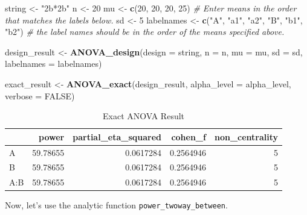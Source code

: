 \documentclass[
]{book}
\newenvironment{Shaded}{\begin{snugshade}}{\end{snugshade}}
\newcommand{\CommentTok}[1]{\textcolor[rgb]{0.56,0.35,0.01}{\textit{#1}}}
\newcommand{\DataTypeTok}[1]{\textcolor[rgb]{0.13,0.29,0.53}{#1}}
\newcommand{\DecValTok}[1]{\textcolor[rgb]{0.00,0.00,0.81}{#1}}
\newcommand{\KeywordTok}[1]{\textcolor[rgb]{0.13,0.29,0.53}{\textbf{#1}}}
\newcommand{\NormalTok}[1]{#1}
\newcommand{\OperatorTok}[1]{\textcolor[rgb]{0.81,0.36,0.00}{\textbf{#1}}}
\newcommand{\OtherTok}[1]{\textcolor[rgb]{0.56,0.35,0.01}{#1}}
\newcommand{\StringTok}[1]{\textcolor[rgb]{0.31,0.60,0.02}{#1}}
\begin{document}
\begin{Shaded}
\begin{Highlighting}[]
\NormalTok{string <-}\StringTok{ "2b*2b"}
\NormalTok{n <-}\StringTok{ }\DecValTok{20}
\NormalTok{mu <-}\StringTok{ }\KeywordTok{c}\NormalTok{(}\DecValTok{20}\NormalTok{, }\DecValTok{20}\NormalTok{, }\DecValTok{20}\NormalTok{, }\DecValTok{25}\NormalTok{) }
\CommentTok{# Enter means in the order that matches the labels below.}
\NormalTok{sd <-}\StringTok{ }\DecValTok{5}
\NormalTok{labelnames <-}\StringTok{ }\KeywordTok{c}\NormalTok{(}\StringTok{"A"}\NormalTok{, }\StringTok{"a1"}\NormalTok{, }\StringTok{"a2"}\NormalTok{, }\StringTok{"B"}\NormalTok{, }\StringTok{"b1"}\NormalTok{, }\StringTok{"b2"}\NormalTok{) }
\CommentTok{# the label names should be in the order of the means specified above.}

\NormalTok{design_result <-}\StringTok{ }\KeywordTok{ANOVA_design}\NormalTok{(}\DataTypeTok{design =}\NormalTok{ string,}
                   \DataTypeTok{n =}\NormalTok{ n, }
                   \DataTypeTok{mu =}\NormalTok{ mu, }
                   \DataTypeTok{sd =}\NormalTok{ sd, }
                   \DataTypeTok{labelnames =}\NormalTok{ labelnames)}



\NormalTok{exact_result <-}\StringTok{ }\KeywordTok{ANOVA_exact}\NormalTok{(design_result,}
                            \DataTypeTok{alpha_level =}\NormalTok{ alpha_level,}
                            \DataTypeTok{verbose =} \OtherTok{FALSE}\NormalTok{)}
\end{Highlighting}
\end{Shaded}

\begin{table}[!h]

\caption{\label{tab:unnamed-chunk-268}Exact ANOVA Result}
\centering
\begin{tabular}[t]{l|r|r|r|r}
\hline
  & power & partial\_eta\_squared & cohen\_f & non\_centrality\\
\hline
A & 59.78655 & 0.0617284 & 0.2564946 & 5\\
\hline
B & 59.78655 & 0.0617284 & 0.2564946 & 5\\
\hline
A:B & 59.78655 & 0.0617284 & 0.2564946 & 5\\
\hline
\end{tabular}
\end{table}

Now, let's use the analytic function \texttt{power\_twoway\_between}.

\begin{Shaded}
\end{Shaded}
\end{document}
